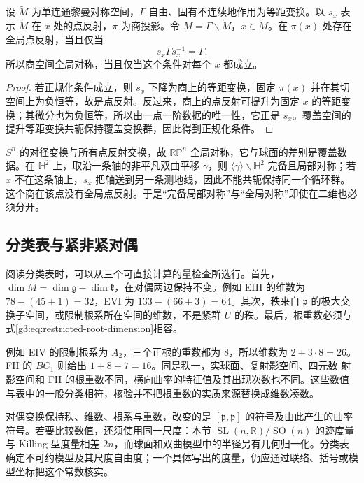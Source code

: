 \begin{proposition}\label{g3:prop:symmetric-quotient-reflection-criterion}
	设 \(\widetilde M\) 为单连通黎曼对称空间，\(\Gamma\) 自由、固有不连续地作用为等距变换。以 \(s_x\) 表示 \(\widetilde M\) 在 \(x\) 处的点反射，\(\pi\) 为商投影。令 \(M=\Gamma\backslash\widetilde M\)，\(x\in\widetilde M\)。在 \(\pi(x)\) 处存在全局点反射，当且仅当
	\[
		s_x\Gamma s_x^{-1}=\Gamma.
	\]
	所以商空间全局对称，当且仅当这个条件对每个 \(x\) 都成立。
\end{proposition}
\begin{proof}
	若正规化条件成立，则 \(s_x\) 下降为商上的等距变换，固定 \(\pi(x)\) 并在其切空间上为负恒等，故是点反射。反过来，商上的点反射可提升为固定 \(x\) 的等距变换；其微分也为负恒等，所以由一点一阶数据的唯一性，它正是 \(s_x\)。覆盖空间的提升等距变换共轭保持覆盖变换群，因此得到正规化条件。
\end{proof}

\(S^n\) 的对径变换与所有点反射交换，故 \(\mathbb{RP}^n\) 全局对称，它与球面的差别是覆盖数据。在 \(\mathbb H^2\) 上，取沿一条轴的非平凡双曲平移 \(\gamma\)，则 \(\langle\gamma\rangle\backslash\mathbb H^2\) 完备且局部对称；若 \(x\) 不在这条轴上，\(s_x\) 把轴送到另一条测地线，因此不能共轭保持同一个循环群。这个商在该点没有全局点反射。于是“完备局部对称”与“全局对称”即使在二维也必须分开。

\subsection{分类表与紧非紧对偶}
\label{g3:subsec:0506:06}

阅读分类表时，可以从三个可直接计算的量检查所选行。首先，\(\dim M=\dim\mathfrak g-\dim\mathfrak k\)，在对偶两边保持不变。例如 EIII 的维数为 \(78-(45+1)=32\)，EVI 为 \(133-(66+3)=64\)。其次，秩来自 \(\mathfrak p\) 的极大交换子空间，或限制根系所在空间的维数，不是紧群 \(U\) 的秩。最后，根重数必须与式\eqref{g3:eq:restricted-root-dimension}相容。

\ProseParagraphBreak

例如 EIV 的限制根系为 \(A_2\)，三个正根的重数都为 \(8\)，所以维数为 \(2+3\cdot8=26\)。FII 的 \(BC_1\) 则给出 \(1+8+7=16\)。同是秩一，实球面、复射影空间、四元数 射影空间和 FII 的根重数不同，横向曲率的特征值及其出现次数也不同。这些数值与表中的一般分类相符，核验并不把根重数的实质来源替换成维数凑数。

\ProseParagraphBreak

对偶变换保持秩、维数、根系与重数，改变的是 \([\mathfrak p,\mathfrak p]\) 的符号及由此产生的曲率符号。若要比较数值，还须使用同一尺度：本节 \(\operatorname{SL}(n,\mathbb R)/\operatorname{SO}(n)\) 的迹度量与 Killing 型度量相差 \(2n\)，而球面和双曲模型中的半径另有几何归一化。分类表确定不可约模型及其尺度自由度；一个具体写出的度量，仍应通过联络、括号或模型坐标把这个常数核实。
